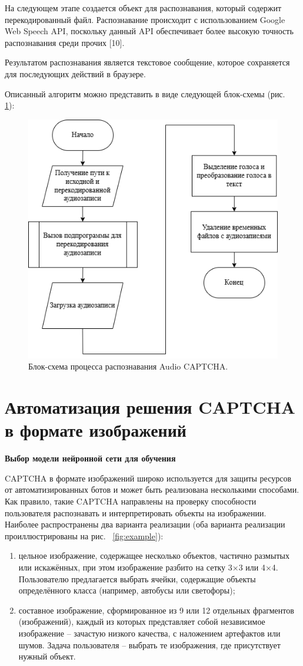 На следующем этапе создается объект для распознавания, который содержит 
перекодированный файл. Распознавание происходит с использованием Google Web 
Speech API, поскольку данный API обеспечивает более высокую точность 
распознавания среди прочих [10].

Результатом распознавания является текстовое сообщение, которое сохраняется для 
последующих действий в браузере.

Описанный алгоритм можно представить в виде следующей блок-схемы (рис.~
\ref{fig:recognize-audio}):

\begin{figure}[H]
    \centering
    \includegraphics[width=0.6\linewidth]{
        imgs/audiocaptcha/recognize_audiocaptcha.png
    }
    \caption{Блок-схема процесса распознавания Audio CAPTCHA.}
    \label{fig:recognize-audio}
\end{figure}

\section{Автоматизация решения CAPTCHA в формате изображений}

\textbf{Выбор модели нейронной сети для обучения}

CAPTCHA в формате изображений широко используется для защиты ресурсов от 
автоматизированных ботов и может быть реализована несколькими способами. Как 
правило, такие CAPTCHA направлены на проверку способности пользователя 
распознавать и интерпретировать объекты на изображении. Наиболее распространены 
два варианта реализации (оба варианта реализации проиллюстрированы на рис.~
\ref{fig:example}):

\begin{enumerate}
    \item цельное изображение, содержащее несколько объектов, частично размытых 
    или искажённых, при этом изображение разбито на сетку 3×3 или 4×4. 
    Пользователю предлагается выбрать ячейки, содержащие объекты определённого 
    класса (например, автобусы или светофоры);
    \item составное изображение, сформированное из 9 или 12 отдельных фрагментов 
    (изображений), каждый из которых представляет собой независимое изображение 
    -- зачастую низкого качества, с наложением артефактов или шумов. Задача 
    пользователя -- выбрать те изображения, где присутствует нужный объект.
\end{enumerate}

